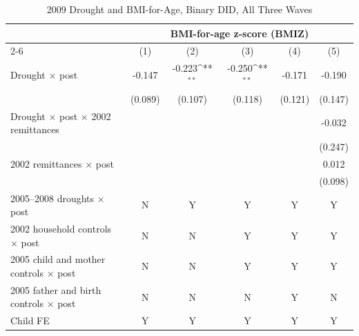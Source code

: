\documentclass[12pt]{article}
\def\sym#1{\ifmmode^{#1}\else\(^{#1}\)\fi}
\begin{document}
\begin{longtable}{l*{5}{c}}
\caption{2009 Drought and BMI-for-Age, Binary DID, All Three Waves}\\
\toprule
 & \multicolumn{5}{c}{BMI-for-age z-score (BMIZ)}\\
\cmidrule(lr){2-6}
            &\multicolumn{1}{c}{(1)}         &\multicolumn{1}{c}{(2)}         &\multicolumn{1}{c}{(3)}         &\multicolumn{1}{c}{(4)}         &\multicolumn{1}{c}{(5)}         \\
\midrule
Drought \ensuremath{\times} post&      -0.147         &      -0.223\sym{**} &      -0.250\sym{**} &      -0.171         &      -0.190         \\
            &     (0.089)         &     (0.107)         &     (0.118)         &     (0.121)         &     (0.147)         \\
Drought \ensuremath{\times} post \ensuremath{\times} 2002 remittances&                     &                     &                     &                     &      -0.032         \\
            &                     &                     &                     &                     &     (0.247)         \\
2002 remittances \ensuremath{\times} post&                     &                     &                     &                     &       0.012         \\
            &                     &                     &                     &                     &     (0.098)         \\
\midrule
2005--2008 droughts \ensuremath{\times} post&           N         &           Y         &           Y         &           Y         &           Y         \\
2002 household controls \ensuremath{\times} post&           N         &           N         &           Y         &           Y         &           Y         \\
2005 child and mother controls \ensuremath{\times} post&           N         &           N         &           Y         &           Y         &           Y         \\
2005 father and birth controls \ensuremath{\times} post&           N         &           N         &           N         &           Y         &           N         \\
Child FE    &           Y         &           Y         &           Y         &           Y         &           Y         \\

\end{longtable}
\end{document}
